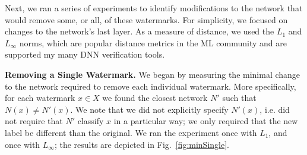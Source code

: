 \documentclass{easychair}
\begin{document}
Next, we ran a series of experiments to identify modifications to the
network that would remove some, or all, of these watermarks. For
simplicity, we
focused on changes to the network's last layer. As a measure of
distance, we used the $L_1$ and $L_\infty$ norms, which are popular
distance metrics in the ML community and are supported my many DNN
verification tools.

\medskip\noindent \textbf{Removing a Single Watermark.}
We began by measuring the minimal change to the network required to
remove each individual watermark. More specifically, for each
watermark $x\in X$ we found the closest network $N'$ such that
$N(x)\neq N'(x)$. We note that we did not explicitly specify $N'(x)$,
i.e. did not require that $N'$ classify $x$ in a particular way; we
only required that the new label be different than the original. We
ran the experiment once with $L_1$, and once with $L_\infty$; the
results are depicted in Fig.~\ref{fig:minSingle}.
\end{document}
